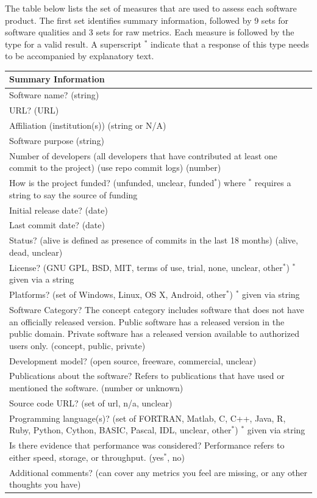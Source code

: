 \documentclass[letterpaper,cleveref]{lipics-v2019}
\begin{document}
The table below lists the set of measures that are used to assess each software
product. The first set identifies summary information, followed by 9 sets for
software qualities and 3 sets for raw metrics. Each measure is followed by the
type for a valid result. A superscript $^*$ indicate that a response of this type
needs to be accompanied by explanatory text.

\newpage

\label{measurementtemplate}
\def\arraystretch{1.22}
\begin{tabular}{p{14cm}}
	\hline
	\textbf{Summary Information}\\
	\hline
	Software name? (string)\\
	URL? (URL)\\
	Affiliation (institution(s)) (string or {N/A})\\
	Software purpose (string)\\
	Number of developers (all developers that have contributed at least one commit
	to the project) (use repo commit logs) (number)\\
	How is the project funded? (unfunded, unclear, funded$^*$) where $^*$ requires a
	string to say the source of funding\\
	Initial release date? (date)\\
	Last commit date? (date)\\
	Status? (alive is defined as presence of commits in the last 18 months)
	({alive, dead, unclear})\\
	License? ({GNU GPL, BSD, MIT, terms of use, trial, none, unclear, other$^*$}) $^*$
	given via a string \\
	Platforms? (set of {Windows, Linux, OS X, Android, other$^*$}) $^*$ given via
	string\\
	Software Category? The concept category includes software that does not have
	an officially released version. Public software has a released version in the
	public domain. Private software has a released version available to authorized
	users only. ({concept, public, private})\\
	Development model? ({open source, freeware, commercial, unclear})\\
	Publications about the software? Refers to publications that have used or
	mentioned the software. (number or {unknown})\\
	Source code URL? ({set of url, n/a, unclear})\\
	Programming language(s)? (set of {FORTRAN, Matlab, C, C++, Java, R, Ruby,
	Python, Cython, BASIC, Pascal, IDL, unclear, other$^*$}) $^*$ given via string \\
	Is there evidence that performance was considered? Performance refers to
	either speed, storage, or throughput. ({yes$^*$, no})\\
	Additional comments? (can cover any metrics you feel are missing, or any other
	thoughts you have) \\
	\hline
\end{tabular}
\end{document}
